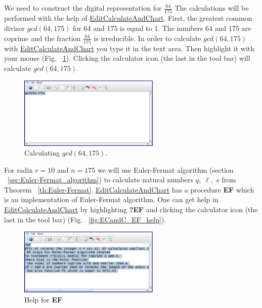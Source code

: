 \documentclass[color=black,11pt]{elegantpaper}
\begin{document}
\begin{example}
\label{ex:decimal}
We need to construct the digital representation for $\frac{64}{175} $ The calculations will be performed with the help of \href{https://github.com/mathhobbit/EditCalculateAndChart/releases}{EditCalculateAndChart}. First, the greatest common divisor $gcd(64,175)$ for $64$ and $175$ is equal to $1.$  The numbers $64$ and $175$ are coprime and the fraction $\frac{64}{175} $ is irreducible. In order to calculate $gcd(64,175)$ with \href{https://github.com/mathhobbit/EditCalculateAndChart/releases}{EditCalculateAndChart} you type it in the text area. Then highlight it with your mouse (Fig. ~\ref{fig:ECandC_gcd}). Clicking the calculator icon (the last in the tool bar) will calculate $gcd(64,175).$ 
\begin{figure}[htbp]
  \centering
  \includegraphics[width=0.6\textwidth]{image/ECandC_gcd.eps}
  \caption{Calculating $gcd(64,175).$} 
  \label{fig:ECandC_gcd}
\end{figure}
For radix $r=10$ and $n=175$ we will use Euler-Fermat algorithm (section ~\ref{sec:Euler-Fermat_algorithm}) to calculate natural numbers $q,\;\ell,\;s$ from Theorem ~\ref{th:Euler-Fermat}. \href{https://github.com/mathhobbit/EditCalculateAndChart/releases}{EditCalculateAndChart} has a procedure {\bf EF} which is an implementation of Euler-Fermat algorithm. One can get help in  \href{https://github.com/mathhobbit/EditCalculateAndChart/releases}{EditCalculateAndChart} by highlighting {\bf ?EF} and clicking the calculator icon (the last in the tool bar) (Fig. ~\ref{fig:ECandC_EF_help}).
\begin{figure}[htbp]
  \centering
  \includegraphics[width=0.6\textwidth]{image/ECandC_EF_help.eps}
  \caption{Help for {\bf EF}} 

\end{figure}
\end{example}
\end{document}
